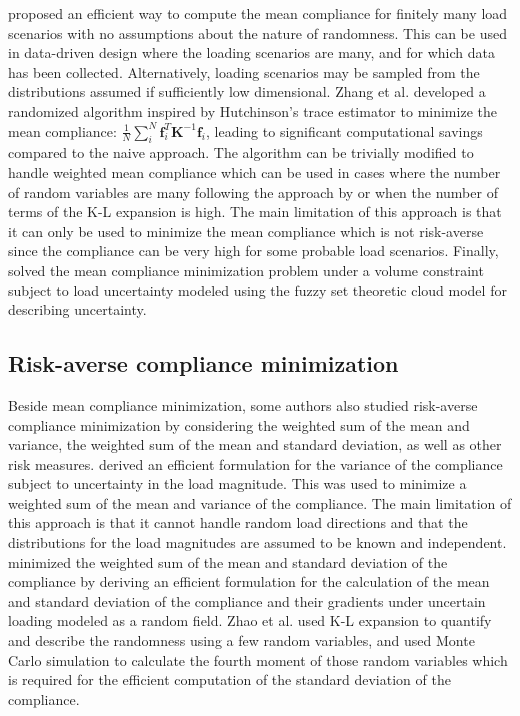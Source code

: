     \cite{Zhang2017a} proposed an efficient way to compute the mean compliance for finitely many load scenarios with no assumptions about the nature of randomness. This can be used in data-driven design where the loading scenarios are many, and for which data has been collected. Alternatively, loading scenarios may be sampled from the distributions assumed if sufficiently low dimensional. Zhang et al. developed a randomized algorithm inspired by Hutchinson's trace estimator \cite{Hutchinson1990} to minimize the mean compliance: $\frac{1}{N} \sum_i^N \bm{f}^T_i \bm{K}^{-1} \bm{f}_i$, leading to significant computational savings compared to the naive approach. The algorithm can be trivially modified to handle weighted mean compliance which can be used in cases where the number of random variables are many following the approach by \cite{Zhao2014} or when the number of terms of the K-L expansion is high. The main limitation of this approach is that it can only be used to minimize the mean compliance which is not risk-averse since the compliance can be very high for some probable load scenarios. Finally, \cite{Liu2018a} solved the mean compliance minimization problem under a volume constraint subject to load uncertainty modeled using the fuzzy set theoretic cloud model for describing uncertainty.

  \subsection{Risk-averse compliance minimization}

    Beside mean compliance minimization, some authors also studied risk-averse compliance minimization by considering the weighted sum of the mean and variance, the weighted sum of the mean and standard deviation, as well as other risk measures. \cite{Dunning2013} derived an efficient formulation for the variance of the compliance subject to uncertainty in the load magnitude. This was used to minimize a weighted sum of the mean and variance of the compliance. The main limitation of this approach is that it cannot handle random load directions and that the distributions for the load magnitudes are assumed to be known and independent. \cite{Zhao2014b} minimized the weighted sum of the mean and standard deviation of the compliance by deriving an efficient formulation for the calculation of the mean and standard deviation of the compliance and their gradients under uncertain loading modeled as a random field. Zhao et al. used K-L expansion to quantify and describe the randomness using a few random variables, and used Monte Carlo simulation to calculate the fourth moment of those random variables which is required for the efficient computation of the standard deviation of the compliance.

